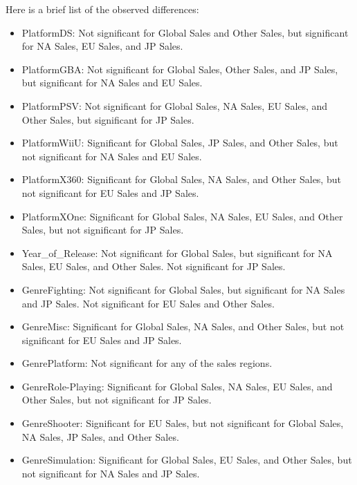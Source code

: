 \documentclass[12pt]{article}
\begin{document}
Here is a brief list of the observed differences:
\begin{itemize}
    \item PlatformDS: Not significant for Global Sales and Other Sales, but significant for NA Sales, EU Sales, and JP Sales.

    \item PlatformGBA: Not significant for Global Sales, Other Sales, and JP Sales, but significant for NA Sales and EU Sales.

    \item PlatformPSV: Not significant for Global Sales, NA Sales, EU Sales, and Other Sales, but significant for JP Sales.

    \item PlatformWiiU: Significant for Global Sales, JP Sales, and Other Sales, but not significant for NA Sales and EU Sales.

    \item PlatformX360: Significant for Global Sales, NA Sales, and Other Sales, but not significant for EU Sales and JP Sales.

    \item PlatformXOne: Significant for Global Sales, NA Sales, EU Sales, and Other Sales, but not significant for JP Sales.

    \item Year\_of\_Release: Not significant for Global Sales, but significant for NA Sales, EU Sales, and Other Sales. Not significant for JP Sales.

    \item GenreFighting: Not significant for Global Sales, but significant for NA Sales and JP Sales. Not significant for EU Sales and Other Sales.

    \item GenreMisc: Significant for Global Sales, NA Sales, and Other Sales, but not significant for EU Sales and JP Sales.

    \item GenrePlatform: Not significant for any of the sales regions.

    \item GenreRole-Playing: Significant for Global Sales, NA Sales, EU Sales, and Other Sales, but not significant for JP Sales.

    \item GenreShooter: Significant for EU Sales, but not significant for Global Sales, NA Sales, JP Sales, and Other Sales.

    \item GenreSimulation: Significant for Global Sales, EU Sales, and Other Sales, but not significant for NA Sales and JP Sales.


\end{itemize}
\end{document}
